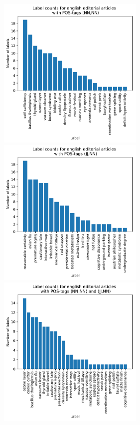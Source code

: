 {%
\begin{figure}[h]
	\centering
	\begin{minipage}[t]{0.5\textwidth}
		\includegraphics[width=7cm]{gfx/POS-gen1/mit_NN.pdf}
	\end{minipage}%
	\begin{minipage}[t]{0.5\textwidth}
		\includegraphics[width=7cm]{gfx/POS-gen1/mit_JJNN.pdf}
	\end{minipage}
	\begin{minipage}[t]{0.5\textwidth}
		\includegraphics[width=7cm]{gfx/POS-gen1/mit_beiden_pos.pdf}

\end{minipage}
\end{figure}}

